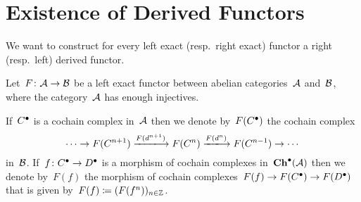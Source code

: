 \section{Existence of Derived Functors}


\begin{goalnonum}
  We want to construct for every left exact (resp.\ right exact) functor a right (resp.\ left) derived functor.
\end{goalnonum}


\begin{conventionnonum}
  Let~$F \colon \mathcal{A} \to \mathcal{B}$ be a left exact functor between abelian categories~$\mathcal{A}$ and~$\mathcal{B}$, where the category~$\mathcal{A}$ has enough injectives.
\end{conventionnonum}


\begin{notation*}
  If~$C^\bullet$ is a cochain complex in~$\mathcal{A}$ then we denote by~$F(C^\bullet)$ the cochain complex
  \[
    \dotsb
    \to
    F(C^{n+1})
    \xlongto{F(d^{n+1})}
    F(C^n)
    \xlongto{F(d^n)}
    F(C^{n-1})
    \to
    \dotsb
  \]
  in~$\mathcal{B}$.
  If~$f \colon C^\bullet \to D^\bullet$ is a morphism of cochain complexes in~$\mathbf{Ch}^\bullet(\mathcal{A})$ then we denote by~$F(f)$ the morphism of cochain complexes~$F(f) \to F(C^\bullet) \to F(D^\bullet)$ that is given by~$F(f) \coloneqq (F(f^n))_{n \in \mathbb{Z}}$.
\end{notation*}


